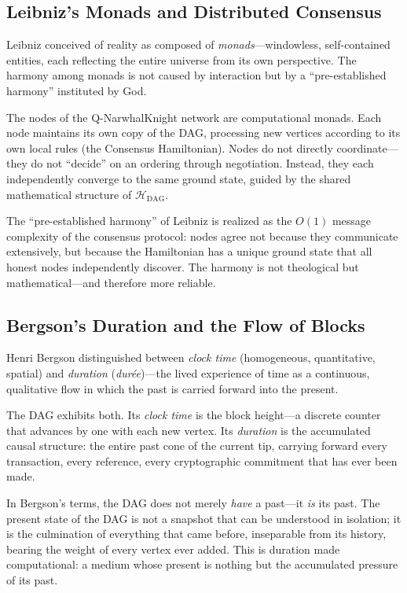 \documentclass[12pt,a4paper]{article}
\theoremstyle{philosophical}
\begin{document}
\subsection{Leibniz's Monads and Distributed Consensus}

Leibniz conceived of reality as composed of \emph{monads}---windowless, self-contained entities, each reflecting the entire universe from its own perspective. The harmony among monads is not caused by interaction but by a ``pre-established harmony'' instituted by God.

The nodes of the Q-NarwhalKnight network are computational monads. Each node maintains its own copy of the DAG, processing new vertices according to its own local rules (the Consensus Hamiltonian). Nodes do not directly coordinate---they do not ``decide'' on an ordering through negotiation. Instead, they each independently converge to the same ground state, guided by the shared mathematical structure of $\mathcal{H}_{\mathrm{DAG}}$.

The ``pre-established harmony'' of Leibniz is realized as the $O(1)$ message complexity of the consensus protocol: nodes agree not because they communicate extensively, but because the Hamiltonian has a unique ground state that all honest nodes independently discover. The harmony is not theological but mathematical---and therefore more reliable.

\subsection{Bergson's Duration and the Flow of Blocks}

Henri Bergson distinguished between \emph{clock time} (homogeneous, quantitative, spatial) and \emph{duration} (\emph{dur\'ee})---the lived experience of time as a continuous, qualitative flow in which the past is carried forward into the present.

The DAG exhibits both. Its \emph{clock time} is the block height---a discrete counter that advances by one with each new vertex. Its \emph{duration} is the accumulated causal structure: the entire past cone of the current tip, carrying forward every transaction, every reference, every cryptographic commitment that has ever been made.

In Bergson's terms, the DAG does not merely \emph{have} a past---it \emph{is} its past. The present state of the DAG is not a snapshot that can be understood in isolation; it is the culmination of everything that came before, inseparable from its history, bearing the weight of every vertex ever added. This is duration made computational: a medium whose present is nothing but the accumulated pressure of its past.
\end{document}
